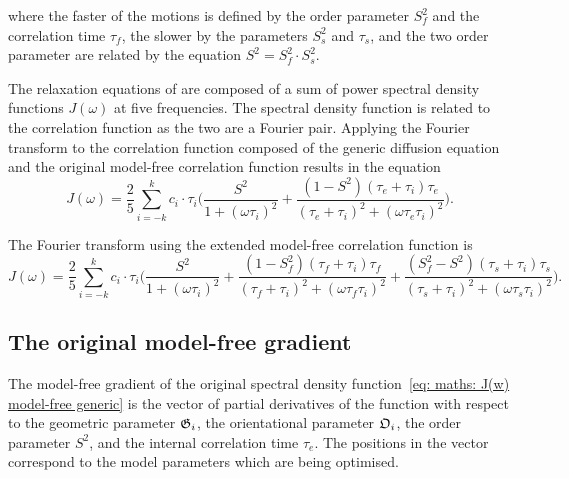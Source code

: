 \noindent where the faster of the motions is defined by the order parameter $S^2_f$ and the correlation time $\tau_f$, the slower by the parameters $S^2_s$ and $\tau_s$, and the two order parameter are related by the equation $S^2 = S^2_f \cdot S^2_s$.

The relaxation equations of \citet{Abragam61} are composed of a sum of power spectral density functions $J(\omega)$ at five frequencies.
The spectral density function is related to the correlation function as the two are a Fourier pair.
Applying the Fourier transform to the correlation function composed of the generic diffusion equation and the original model-free correlation function results in the equation
\begin{equation} \label{eq: maths: J(w) model-free generic}
    J(\omega) = \frac{2}{5} \sum_{i=-k}^k c_i \cdot \tau_i \Bigg(
        \frac{S^2}{1 + (\omega \tau_i)^2}
        + \frac{(1 - S^2)(\tau_e + \tau_i)\tau_e}{(\tau_e + \tau_i)^2 + (\omega \tau_e \tau_i)^2}
    \Bigg).
\end{equation}

The Fourier transform using the extended model-free correlation function is
\begin{equation} \label{eq: maths: J(w) model-free ext generic}
    J(\omega) = \frac{2}{5} \sum_{i=-k}^k c_i \cdot \tau_i \Bigg(
        \frac{S^2}{1 + (\omega \tau_i)^2}
        + \frac{(1 - S^2_f)(\tau_f + \tau_i)\tau_f}{(\tau_f + \tau_i)^2 + (\omega \tau_f \tau_i)^2}
        + \frac{(S^2_f - S^2)(\tau_s + \tau_i)\tau_s}{(\tau_s + \tau_i)^2 + (\omega \tau_s \tau_i)^2}
    \Bigg).
\end{equation}




\subsection{The original model-free gradient}

The model-free gradient of the original spectral density function~\eqref{eq: maths: J(w) model-free generic} is the vector of partial derivatives of the function with respect to the geometric parameter $\mathfrak{G}_i$, the orientational parameter $\mathfrak{O}_i$, the order parameter $S^2$, and the internal correlation time $\tau_e$.
The positions in the vector correspond to the model parameters which are being optimised.



